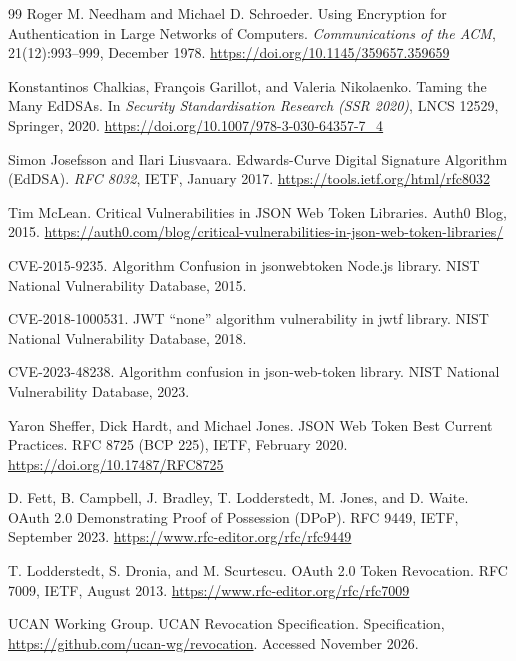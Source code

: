 \documentclass[11pt,a4paper]{article}
\theoremstyle{definition}
\begin{document}
\begin{thebibliography}{99}
Roger M. Needham and Michael D. Schroeder.
\newblock Using Encryption for Authentication in Large Networks of Computers.
\newblock \textit{Communications of the ACM}, 21(12):993--999, December 1978.
\newblock \url{https://doi.org/10.1145/359657.359659}

Konstantinos Chalkias, Fran\c{c}ois Garillot, and Valeria Nikolaenko.
\newblock Taming the Many EdDSAs.
\newblock In \textit{Security Standardisation Research (SSR 2020)}, LNCS 12529, Springer, 2020.
\newblock \url{https://doi.org/10.1007/978-3-030-64357-7_4}

Simon Josefsson and Ilari Liusvaara.
\newblock Edwards-Curve Digital Signature Algorithm (EdDSA).
\newblock \textit{RFC 8032}, IETF, January 2017.
\newblock \url{https://tools.ietf.org/html/rfc8032}

Tim McLean.
\newblock Critical Vulnerabilities in JSON Web Token Libraries.
\newblock Auth0 Blog, 2015.
\newblock \url{https://auth0.com/blog/critical-vulnerabilities-in-json-web-token-libraries/}

CVE-2015-9235.
\newblock Algorithm Confusion in jsonwebtoken Node.js library.
\newblock NIST National Vulnerability Database, 2015.

CVE-2018-1000531.
\newblock JWT ``none'' algorithm vulnerability in jwtf library.
\newblock NIST National Vulnerability Database, 2018.

CVE-2023-48238.
\newblock Algorithm confusion in json-web-token library.
\newblock NIST National Vulnerability Database, 2023.

Yaron Sheffer, Dick Hardt, and Michael Jones.
\newblock JSON Web Token Best Current Practices.
\newblock RFC 8725 (BCP 225), IETF, February 2020.
\newblock \url{https://doi.org/10.17487/RFC8725}

D. Fett, B. Campbell, J. Bradley, T. Lodderstedt, M. Jones, and D. Waite.
\newblock OAuth 2.0 Demonstrating Proof of Possession (DPoP).
\newblock RFC 9449, IETF, September 2023.
\newblock \url{https://www.rfc-editor.org/rfc/rfc9449}

T. Lodderstedt, S. Dronia, and M. Scurtescu.
\newblock OAuth 2.0 Token Revocation.
\newblock RFC 7009, IETF, August 2013.
\newblock \url{https://www.rfc-editor.org/rfc/rfc7009}

UCAN Working Group.
\newblock UCAN Revocation Specification.
\newblock Specification, \url{https://github.com/ucan-wg/revocation}. Accessed November 2026.


\end{thebibliography}
\end{document}
